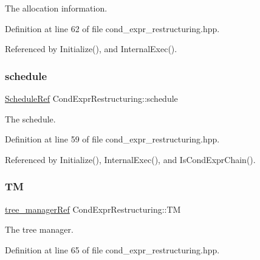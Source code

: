 The allocation information. 



Definition at line 62 of file cond\+\_\+expr\+\_\+restructuring.\+hpp.



Referenced by Initialize(), and Internal\+Exec().

\mbox{\label{classCondExprRestructuring_a959828d99ddb3fbe0ce7d804ecf22940}} 
\subsubsection{\texorpdfstring{schedule}{schedule}}
{\footnotesize\ttfamily \hyperlink{schedule_8hpp_af67f402958b3b52a1ec5cc4ce08ae3b9}{Schedule\+Ref} Cond\+Expr\+Restructuring\+::schedule\hspace{0.3cm}{\ttfamily [private]}}



The schedule. 



Definition at line 59 of file cond\+\_\+expr\+\_\+restructuring.\+hpp.



Referenced by Initialize(), Internal\+Exec(), and Is\+Cond\+Expr\+Chain().

\mbox{\label{classCondExprRestructuring_ac5d2632da0e5b9beae159a7525c16755}} 
\subsubsection{\texorpdfstring{TM}{TM}}
{\footnotesize\ttfamily \hyperlink{tree__manager_8hpp_a96ff150c071ce11a9a7a1e40590f205e}{tree\+\_\+manager\+Ref} Cond\+Expr\+Restructuring\+::\+TM\hspace{0.3cm}{\ttfamily [private]}}



The tree manager. 



Definition at line 65 of file cond\+\_\+expr\+\_\+restructuring.\+hpp.



